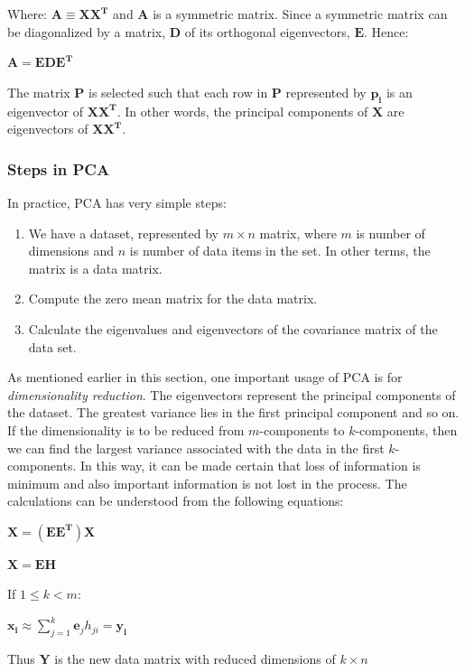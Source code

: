 Where: $\mathbf{A}\equiv\mathbf{XX^T}$ and $\mathbf{A}$ is a symmetric matrix. Since a symmetric matrix can be diagonalized by a matrix, $\mathbf{D}$ of its orthogonal eigenvectors, $\mathbf{E}$. Hence:
\begin{center}
	$\mathbf{A} = \mathbf{EDE^T}$
\end{center}
The matrix $\mathbf{P}$ is selected such that each row in $\mathbf{P}$ represented by $\mathbf{p_i}$ is an eigenvector of $\mathbf{XX^T}$. In other words, the principal components of $\mathbf{X}$ are eigenvectors of $\mathbf{XX^T}$.   
\subsubsection{Steps in PCA}
In practice, PCA has very simple steps:
\begin{enumerate}
	\item We have a dataset, represented by $\mathit{m\times n}$ matrix, where $\mathit{m}$ is number of dimensions and $\mathit{n}$ is number of data items in the set. In other terms, the matrix is a data matrix.
	\item Compute the zero mean matrix for the data matrix.
	\item Calculate the eigenvalues and eigenvectors of the covariance matrix of the data set.
\end{enumerate}
As mentioned earlier in this section, one important usage of PCA is for \textit{dimensionality reduction}. The eigenvectors represent the principal components of the dataset. The greatest variance lies in the first principal component and so on.\\
If the dimensionality is to be reduced from $\mathit{m}$-components to $\mathit{k}$-components, then we can find the largest variance associated with the data in the first $\mathit{k}$-components. In this way, it can be made certain that loss of information is minimum and also important information is not lost in the process.
The calculations can be understood from the following equations:
\begin{center}
	$\mathbf{X} =\mathbf{(EE^T)X} $
\end{center}
\begin{center}
	$\mathbf{X = EH}$
\end{center}
\begin{center}
	If $1\leq k< m$:
\end{center}
\begin{center}
	$\mathbf{x_i}\approx \sum_{j=1}^{k}\mathbf{e}_jh_{ji} = \mathbf{y_i}$
\end{center}
Thus $\mathbf{Y}$ is the new data matrix with reduced dimensions of $\mathit{k\times n}$

